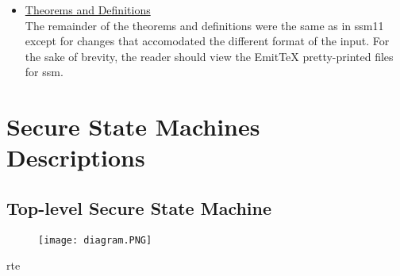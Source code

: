 \begin{itemize}
 \item \underline{Theorems and Definitions}\\
  The remainder of the theorems and definitions were the same as in ssm11 except for changes that
  accomodated the different format of the input.  For the sake of brevity, the reader should view
  the EmitTeX pretty-printed files for ssm.
  
  \end{itemize}
 

\section{Secure State Machines Descriptions}
\label{sec:secure-state-mach}

\subsection{Top-level Secure State Machine}
\label{sec:top-level-secure}

\begin{figure}[h]
  \centering
  \texttt{[image: diagram.PNG]}
\end{figure}


rte






